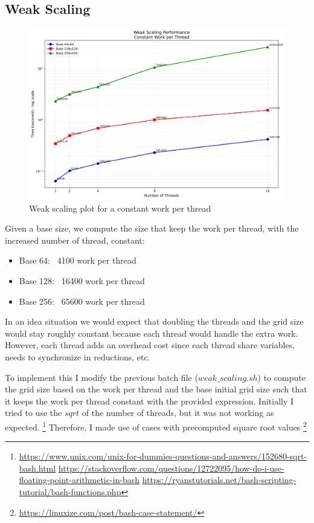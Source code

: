 \documentclass[unicode,11pt,a4paper,oneside,numbers=endperiod,openany]{scrartcl}
\begin{document}
\subsection{Weak Scaling}
\begin{figure}[H]
  \centering
  \includegraphics[width=\textwidth]{./img/exe2/weak_scaling.png}
  \caption{Weak scaling plot for a constant work per thread}
\end{figure}

Given a base size, we compute the size that keep the work per thread, with the increased
number of thread, constant:
\begin{itemize}
  \item Base 64: ~4100 work per thread
  \item Base 128: ~16400 work per thread
  \item Base 256: ~65600 work per thread
\end{itemize}

In an idea situation we would expect that doubling the threads and the grid size 
would stay roughly constant because each thread would handle the extra work. However, 
each thread adds an overhead cost since each thread share variables, needs to synchronize 
in reductions, etc. 

To implement this I modify the previous batch file ($weak\_scaling.sh$) to compute the 
grid size based on the work per thread and the base initial grid size such that it keeps the 
work per thread constant with the provided expression. Initially I tried to use the $sqrt$ of the number of threads, but 
it was not working as expected. \footnote{\url{https://www.unix.com/unix-for-dummies-questions-and-answers/152680-sqrt-bash.html}
\newline
\url{https://stackoverflow.com/questions/12722095/how-do-i-use-floating-point-arithmetic-in-bash}
\newline
\url{https://ryanstutorials.net/bash-scripting-tutorial/bash-functions.php}
}
Therefore, I made use of cases with precomputed square root values \footnote{\url{https://linuxize.com/post/bash-case-statement/}}
\end{document}
